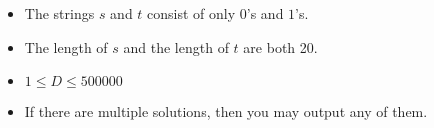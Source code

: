 \begin{itemize}
\tightlist
\item The strings $s$ and $t$ consist of only $0$'s and $1$'s.
\item The length of $s$ and the length of $t$ are both 20.
\item $1\le D\le 500000$
\item If there are multiple solutions, then you may output any of them.
\end{itemize}
\newpage
